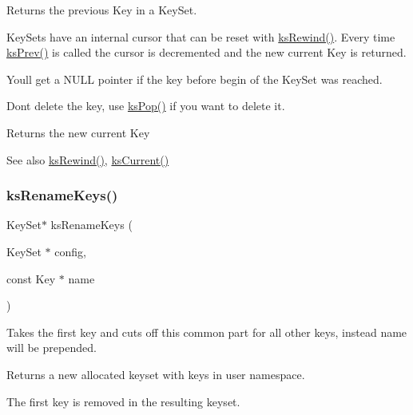 Returns the previous Key in a Key\+Set. 

Key\+Sets have an internal cursor that can be reset with \hyperlink{group__keyset_gabe793ff51f1728e3429c84a8a9086b70}{ks\+Rewind()}. Every time \hyperlink{group__api_gae7d268f13dd89a6e126b3718b117996f}{ks\+Prev()} is called the cursor is decremented and the new current Key is returned.

You\textquotesingle{}ll get a N\+U\+LL pointer if the key before begin of the Key\+Set was reached.

Don\textquotesingle{}t delete the key, use \hyperlink{group__keyset_gae42530b04defb772059de0600159cf69}{ks\+Pop()} if you want to delete it.

\begin{DoxyReturn}{Returns}
the new current Key 
\end{DoxyReturn}
\begin{DoxySeeAlso}{See also}
\hyperlink{group__keyset_gabe793ff51f1728e3429c84a8a9086b70}{ks\+Rewind()}, \hyperlink{group__keyset_ga4287b9416912c5f2ab9c195cb74fb094}{ks\+Current()} 
\end{DoxySeeAlso}
\mbox{\label{group__api_ga7557d07db07649b9d81e6da63ce59376}} 
\subsubsection{\texorpdfstring{ks\+Rename\+Keys()}{ksRenameKeys()}}
{\footnotesize\ttfamily Key\+Set$\ast$ ks\+Rename\+Keys (\begin{DoxyParamCaption}\item[{Key\+Set $\ast$}]{config,  }\item[{const Key $\ast$}]{name }\end{DoxyParamCaption})}



Takes the first key and cuts off this common part for all other keys, instead name will be prepended. 

\begin{DoxyReturn}{Returns}
a new allocated keyset with keys in user namespace.
\end{DoxyReturn}
The first key is removed in the resulting keyset. 